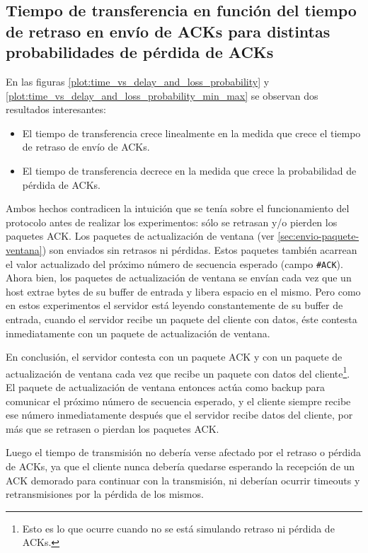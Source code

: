 \documentclass[a4paper, 10pt, twoside]{article}
\newcommand{\ack}{\texttt{\#ACK}\xspace}
\begin{document}
\subsection{Tiempo de transferencia en función del tiempo de retraso en envío de ACKs para distintas probabilidades de pérdida de ACKs}

En las figuras \ref{plot:time_vs_delay_and_loss_probability} y \ref{plot:time_vs_delay_and_loss_probability_min_max} se observan dos resultados interesantes:

\begin{itemize}
  \item El tiempo de transferencia crece linealmente en la medida que crece el tiempo de retraso de envío de ACKs.

  \item El tiempo de transferencia decrece en la medida que crece la probabilidad de pérdida de ACKs.
\end{itemize}

Ambos hechos contradicen la intuición que se tenía sobre el funcionamiento del protocolo antes de realizar los experimentos: sólo se retrasan y/o pierden los paquetes ACK. Los paquetes de actualización de ventana (ver \ref{sec:envio-paquete-ventana}) son enviados sin retrasos ni pérdidas. Estos paquetes también acarrean el valor actualizado del próximo número de secuencia esperado (campo \ack). Ahora bien, los paquetes de actualización de ventana se envían cada vez que un host extrae bytes de su buffer de entrada y libera espacio en el mismo. Pero como en estos experimentos el servidor está leyendo constantemente de su buffer de entrada, cuando el servidor recibe un paquete del cliente con datos, éste contesta inmediatamente con un paquete de actualización de ventana.

En conclusión, el servidor contesta con un paquete ACK y con un paquete de actualización de ventana cada vez que recibe un paquete con datos del cliente\footnote{Esto es lo que ocurre cuando no se está simulando retraso ni pérdida de ACKs.}. El paquete de actualización de ventana entonces actúa como backup para comunicar el próximo número de secuencia esperado, y el cliente siempre recibe ese número inmediatamente después que el servidor recibe datos del cliente, por más que se retrasen o pierdan los paquetes ACK.

Luego el tiempo de transmisión no debería verse afectado por el retraso o pérdida de ACKs, ya que el cliente nunca debería quedarse esperando la recepción de un ACK demorado para continuar con la transmisión, ni deberían ocurrir timeouts y retransmisiones por la pérdida de los mismos.
\end{document}
